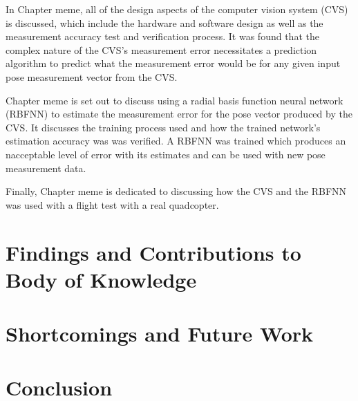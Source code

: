 In Chapter meme, all of the design aspects of the computer vision system (CVS) is discussed, which include the hardware and software design as well as the measurement accuracy test and verification process. It was found that the complex nature of the CVS's measurement error necessitates a prediction algorithm to predict what the measurement error would be for any given input pose measurement vector from the CVS. 

Chapter meme is set out to discuss using a radial basis function neural network (RBFNN) to estimate the measurement error for the pose vector produced by the CVS. It discusses the training process used and how the trained network's estimation accuracy was was verified. A RBFNN was trained which produces an nacceptable level of error with its estimates and can be used with new pose measurement data.

Finally, Chapter meme is dedicated to discussing how the CVS and the RBFNN was used with a flight test with a real quadcopter.

\section{Findings and Contributions to Body of Knowledge}



\section{Shortcomings and Future Work}

\section{Conclusion}
